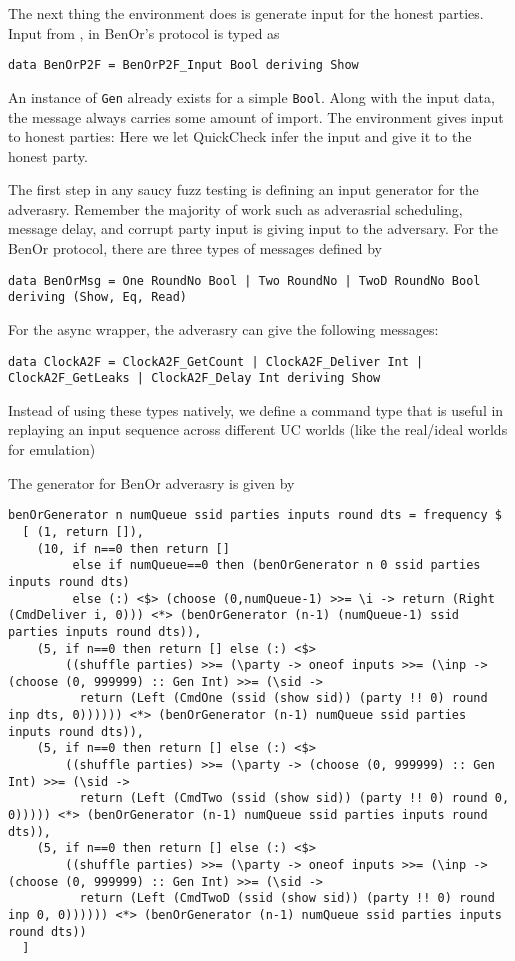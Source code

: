 The next thing the environment does is generate input for the honest parties.
Input from \Z, in BenOr's protocol is typed as
\begin{lstlisting}
data BenOrP2F = BenOrP2F_Input Bool deriving Show
\end{lstlisting}
An instance of \texttt{Gen} already exists for a simple \texttt{Bool}. 
Along with the input data, the message always carries some amount of import.
The environment gives input to honest parties:
Here we let QuickCheck infer the input and give it to the honest party. 

The first step in any saucy fuzz testing is defining an input generator for the adverasry. 
Remember the majority of work such as adverasrial scheduling, message delay, and corrupt party input \Z is giving input to the adversary.   
For the BenOr protocol, there are three types of messages defined by
\begin{lstlisting}
data BenOrMsg = One RoundNo Bool | Two RoundNo | TwoD RoundNo Bool deriving (Show, Eq, Read)
\end{lstlisting}
For the async wrapper, the adverasry can give the following messages:
\begin{lstlisting}
data ClockA2F = ClockA2F_GetCount | ClockA2F_Deliver Int | ClockA2F_GetLeaks | ClockA2F_Delay Int deriving Show
\end{lstlisting}
Instead of using these types natively, we define a command type that is useful in replaying an input sequence across different UC worlds (like the real/ideal worlds for emulation)

The generator for BenOr adverasry is given by
\begin{lstlisting}
benOrGenerator n numQueue ssid parties inputs round dts = frequency $
  [ (1, return []), 
    (10, if n==0 then return []
         else if numQueue==0 then (benOrGenerator n 0 ssid parties inputs round dts)
         else (:) <$> (choose (0,numQueue-1) >>= \i -> return (Right (CmdDeliver i, 0))) <*> (benOrGenerator (n-1) (numQueue-1) ssid parties inputs round dts)),
    (5, if n==0 then return [] else (:) <$> 
        ((shuffle parties) >>= (\party -> oneof inputs >>= (\inp -> (choose (0, 999999) :: Gen Int) >>= (\sid -> 
          return (Left (CmdOne (ssid (show sid)) (party !! 0) round inp dts, 0)))))) <*> (benOrGenerator (n-1) numQueue ssid parties inputs round dts)),
    (5, if n==0 then return [] else (:) <$>
        ((shuffle parties) >>= (\party -> (choose (0, 999999) :: Gen Int) >>= (\sid -> 
          return (Left (CmdTwo (ssid (show sid)) (party !! 0) round 0, 0))))) <*> (benOrGenerator (n-1) numQueue ssid parties inputs round dts)),
    (5, if n==0 then return [] else (:) <$>
        ((shuffle parties) >>= (\party -> oneof inputs >>= (\inp -> (choose (0, 999999) :: Gen Int) >>= (\sid -> 
          return (Left (CmdTwoD (ssid (show sid)) (party !! 0) round inp 0, 0)))))) <*> (benOrGenerator (n-1) numQueue ssid parties inputs round dts)) 
  ]
\end{lstlisting}

